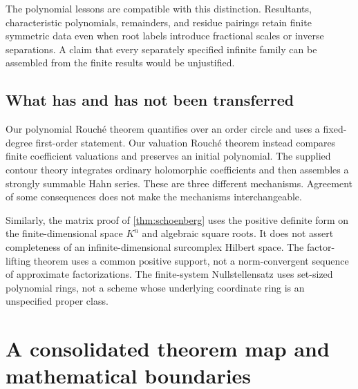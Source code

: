 \documentclass[11pt,letterpaper]{article}
\numberwithin{equation}{section}
\theoremstyle{definition}
\theoremstyle{remark}\newtheorem{remark}[theorem]{Remark}
\begin{document}
The polynomial lessons are compatible with this distinction.
Resultants, characteristic polynomials, remainders, and residue
pairings retain finite symmetric data even when root labels introduce
fractional scales or inverse separations. A claim that every separately
specified infinite family can be assembled from the finite results
would be unjustified.

\subsection{What has and has not been transferred}
Our polynomial Rouch\'e theorem quantifies over an order circle and
uses a fixed-degree first-order statement. Our valuation Rouch\'e
theorem instead compares finite coefficient valuations and preserves
an initial polynomial. The supplied contour theory integrates ordinary
holomorphic coefficients and then assembles a strongly summable Hahn
series. These are three different mechanisms. Agreement of some
consequences does not make the mechanisms interchangeable.

Similarly, the matrix proof of \cref{thm:schoenberg} uses the positive
definite form on the finite-dimensional space $K^n$ and algebraic
square roots. It does not assert completeness of an infinite-dimensional
surcomplex Hilbert space. The factor-lifting theorem uses a common
positive support, not a norm-convergent sequence of approximate
factorizations. The finite-system Nullstellensatz uses set-sized
polynomial rings, not a scheme whose underlying coordinate ring is
an unspecified proper class.

\section{A consolidated theorem map and mathematical boundaries}\label{sec:map}
\end{document}
